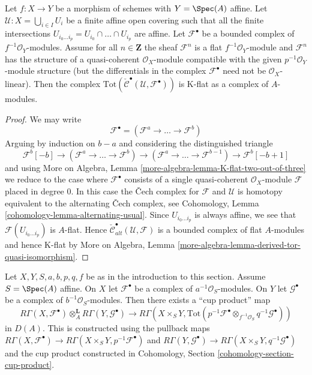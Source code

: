 \begin{lemma}
\label{lemma-K-flat}
Let $f : X \to Y$ be a morphism of schemes with $Y = \Spec(A)$ affine.
Let $\mathcal{U} : X = \bigcup_{i \in I} U_i$ be a finite affine open covering
such that all the finite intersections
$U_{i_0 \ldots i_p} = U_{i_0} \cap \ldots \cap U_{i_p}$
are affine. Let $\mathcal{F}^\bullet$ be a bounded complex of
$f^{-1}\mathcal{O}_Y$-modules. Assume for all $n \in \mathbf{Z}$
the sheaf $\mathcal{F}^n$ is a flat $f^{-1}\mathcal{O}_Y$-module and
$\mathcal{F}^n$ has the structure of a quasi-coherent $\mathcal{O}_X$-module
compatible with the given $p^{-1}\mathcal{O}_Y$-module structure (but the
differentials in the complex $\mathcal{F}^\bullet$ need not
be $\mathcal{O}_X$-linear). Then the complex
$\text{Tot}(\check{\mathcal{C}}^\bullet(\mathcal{U}, \mathcal{F}^\bullet))$
is K-flat as a complex of $A$-modules.
\end{lemma}

\begin{proof}
We may write
$$
\mathcal{F}^\bullet = (\mathcal{F}^a \to \ldots \to \mathcal{F}^b)
$$
Arguing by induction on $b - a$ and considering the distinguished triangle
$$
\mathcal{F}^b[-b] \to (\mathcal{F}^a \to \ldots \to \mathcal{F}^b)
\to (\mathcal{F}^a \to \ldots \to \mathcal{F}^{b - 1}) \to
\mathcal{F}^b[-b + 1]
$$
and using
More on Algebra, Lemma \ref{more-algebra-lemma-K-flat-two-out-of-three}
we reduce to the case where $\mathcal{F}^\bullet$ consists of a
single quasi-coherent $\mathcal{O}_X$-module $\mathcal{F}$
placed in degree $0$. In this case the {\v C}ech complex
for $\mathcal{F}$ and $\mathcal{U}$ is homotopy equivalent to the
alternating {\v C}ech complex, see
Cohomology, Lemma \ref{cohomology-lemma-alternating-usual}.
Since $U_{i_0 \ldots i_p}$ is always affine, we see that
$\mathcal{F}(U_{i_0 \ldots i_p})$ is $A$-flat.
Hence
$\check{\mathcal{C}}_{alt}^\bullet(\mathcal{U}, \mathcal{F})$
is a bounded complex of flat $A$-modules and hence K-flat
by More on Algebra, Lemma
\ref{more-algebra-lemma-derived-tor-quasi-isomorphism}.
\end{proof}

\noindent
Let $X, Y, S, a, b, p, q, f$ be as in the introduction to this section.
Assume $S = \Spec(A)$ affine. On $X$ let $\mathcal{F}^\bullet$
be a complex of $a^{-1}\mathcal{O}_S$-modules. On $Y$ let
$\mathcal{G}^\bullet$ be a complex of $b^{-1}\mathcal{O}_S$-modules.
Then there exists a ``cup product'' map
\begin{equation}
\label{equation-de-rham-kunneth}
R\Gamma(X, \mathcal{F}^\bullet)
\otimes_A^\mathbf{L}
R\Gamma(Y, \mathcal{G}^\bullet)
\longrightarrow
R\Gamma(X \times_S Y,
\text{Tot}(p^{-1}\mathcal{F}^\bullet
\otimes_{f^{-1}\mathcal{O}_S}
q^{-1}\mathcal{G}^\bullet))
\end{equation}
in $D(A)$. This is constructed using the pullback maps
$R\Gamma(X, \mathcal{F}^\bullet) \to
R\Gamma(X \times_S Y, p^{-1}\mathcal{F}^\bullet)$
and
$R\Gamma(Y, \mathcal{G}^\bullet) \to
R\Gamma(X \times_S Y, q^{-1}\mathcal{G}^\bullet)$
and the cup product constructed in
Cohomology, Section \ref{cohomology-section-cup-product}.

